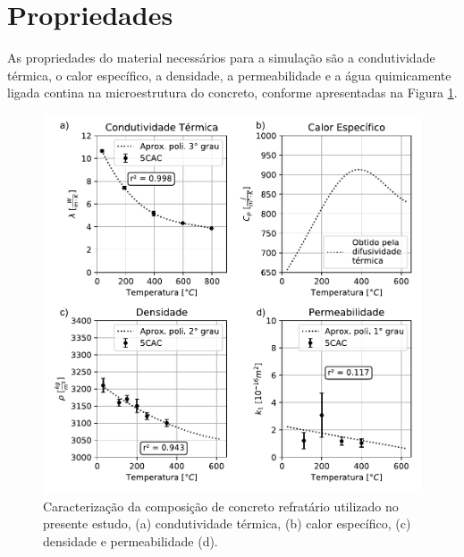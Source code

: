 \section{Propriedades}\label{sec:props}
As propriedades do material necessários para a simulação são a condutividade
térmica, o calor específico, a densidade, a permeabilidade e a água quimicamente
ligada contina na microestrutura do concreto, conforme apresentadas na Figura
\ref{fig:properties}.

 \begin{figure}[ht]
\centering
\includegraphics[width=14cm]{./figures/properties.pdf}
\caption{Caracterização da composição de concreto refratário utilizado no
  presente estudo, (a) condutividade térmica, (b) calor específico, (c)
  densidade e permeabilidade (d).  \label{fig:properties}}
\end{figure}

